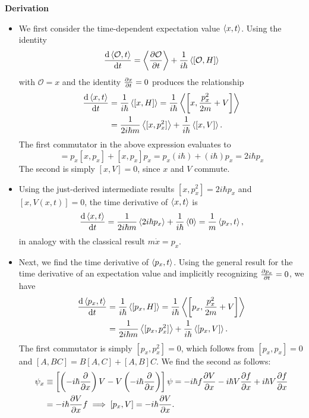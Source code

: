 \documentclass[11pt, a4paper]{article}
\renewcommand{\O}{\mathcal{O}}  %
\newcommand{\p}{\psi}  %
\begin{document}
\vspace{2mm}
\textbf{Derivation}
\begin{itemize}
    \item We first consider the time-dependent expectation value $ \ev{x, t} $. Using the identity
	\begin{equation*}
		\dv{\ev{\O, t}}{t} =  \ev{\pdv{\O}{t}} + \frac{1}{i\hbar}\ev{[\O, H]}
	\end{equation*}
	with $ \O = x $ and the identity $ \pdv{x}{t} = 0 $ produces the relationship
	\begin{align*}
		\dv{\ev{x, t}}{t} &= \frac{1}{i\hbar}\ev{[x, H]} = \frac{1}{i\hbar}\ev{\left[x, \frac{p_{x}^{2}}{2m} + V\right]}\\
		& = \frac{1}{2i\hbar m} \ev{[x, p_{x}^{2}]} + \frac{1}{i\hbar}\ev{[x, V]}.
	\end{align*}
	The first commutator in the above expression evaluates to
	\begin{equation*}
		[x, p_{x}^{2}] = p_{x}[x, p_{x}] + [x, p_{x}]p_{x} = p_{x}(i\hbar) + (i\hbar) p_{x} = 2i \hbar p_{x} 
	\end{equation*}
	The second is simply $ [x, V] = 0 $, since $ x $ and $ V $ commute. 
	
	\item Using the just-derived intermediate results $ [x, p_{x}^{2}] = 2i\hbar p_{x} $ and $ [x, V(x, t)] = 0 $, the time derivative of $ \ev{x, t} $ is 
	\begin{equation*}
		\dv{\ev{x, t}}{t} = \frac{1}{2i\hbar m} \ev{2 i\hbar p_{x}} + \frac{1}{i\hbar}\ev{0} = \frac{1}{m}\ev{p_{x}, t},
	\end{equation*}
	in analogy with the classical result $ m \dot{x} = p_{x} $. 
	
	\item Next, we find the time derivative of $ \ev{p_{x}, t} $. Using the general result for the time derivative of an expectation value and implicitly recognizing $ \pdv{p_{x}}{t} = 0 $, we have
	\begin{align*}
		\dv{\ev{p_{x}, t}}{t} &= \frac{1}{i\hbar}\ev{[p_{x}, H]} = \frac{1}{i\hbar}\ev{\left[p_{x}, \frac{p_{x}^{2}}{2m} + V\right]}\\
		&= \frac{1}{2i \hbar m}\ev{[p_{x}, p_{x}^{2}]} + \frac{1}{i\hbar} \ev{[p_{x}, V]}.
	\end{align*}
	The first commutator is simply $ [p_{x}, p_{x}^{2}] = 0 $, which follows from $ [p_{x}, p_{x}] = 0 $ and $ [A, BC] = B[A, C] + [A, B]C $. We find the second as follows:
	\begin{align*}
		[p_{x}, V]\p_{x} &\equiv \left[ \left(-i\hbar \pdv{x}\right) V - V\left(-i\hbar \pdv{x}\right) \right] \p = - i \hbar f \pdv{V}{x} - i \hbar V \pdv{f}{x} + i \hbar V \pdv{f}{x} \\
		& =  - i \hbar \pdv{V}{x}f \implies [p_{x}, V] = - i \hbar \pdv{V}{x}.
	\end{align*}
	

\end{itemize}
\end{document}
